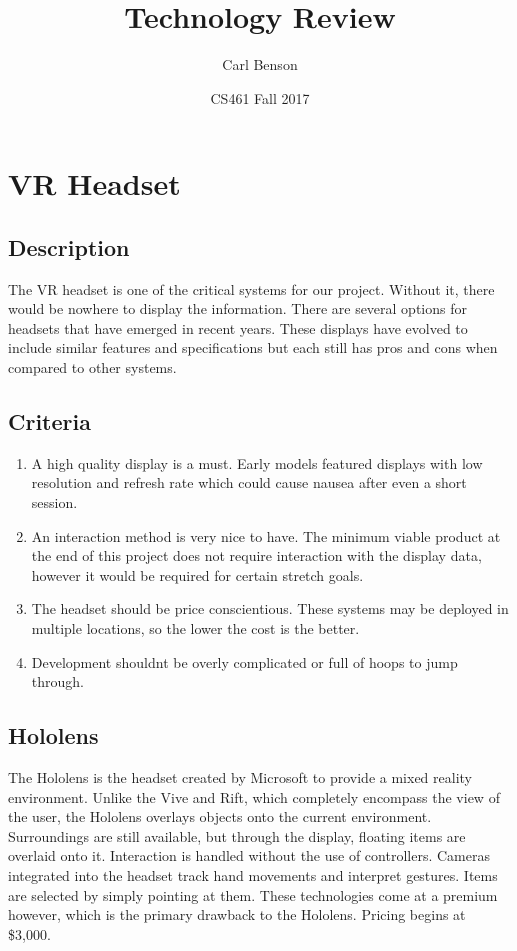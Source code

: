 \documentclass[letterpaper,10pt,onecolumn]{IEEEtran}
\begin{document}
\sloppy
\title{Technology Review}
\date{CS461 Fall 2017}
\author{Carl Benson}

\maketitle

\clearpage

\section{VR Headset}
  \subsection {Description} The VR headset is one of the critical systems for our project. Without it, there would be nowhere to display the information. There are several options for headsets that have emerged in recent years. These displays have evolved to include similar features and specifications but each still has pros and cons when compared to other systems.

  \subsection {Criteria}
    \begin{enumerate}
      \item A high quality display is a must. Early models featured displays with low resolution and refresh rate which could cause nausea after even a short session.
      \item An interaction method is very nice to have. The minimum viable product at the end of this project does not require interaction with the display data, however it would be required for certain stretch goals.
      \item The headset should be price conscientious. These systems may be deployed in multiple locations, so the lower the cost is the better.
      \item Development shouldn\textsc{}t be overly complicated or full of hoops to jump through.
    \end{enumerate}

  \subsection {Hololens}
    The Hololens is the headset created by Microsoft to provide a mixed reality environment. Unlike the Vive and Rift, which completely encompass the view of the user, the Hololens overlays objects onto the current environment. Surroundings are still available, but through the display, floating items are overlaid onto it. Interaction is handled without the use of controllers. Cameras integrated into the headset track hand movements and interpret gestures. Items are selected by simply pointing at them. These technologies come at a premium however, which is the primary drawback to the Hololens. Pricing begins at \$3,000. \cite{hololens}
\end{document}
